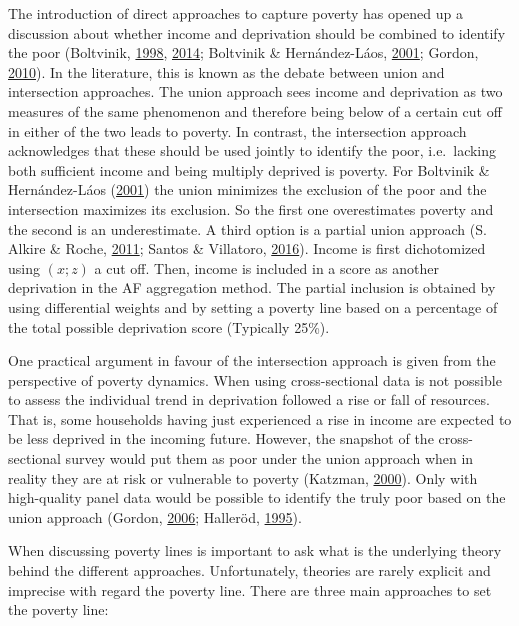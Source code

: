 \documentclass[]{book}
\begin{document}
The introduction of direct approaches to capture poverty has opened up a discussion about whether income and deprivation should be combined to identify the poor (Boltvinik, \protect\hyperlink{ref-Boltvinik1998}{1998}, \protect\hyperlink{ref-Boltvinik2014}{2014}; Boltvinik \& Hernández-Láos, \protect\hyperlink{ref-Boltvinik2001}{2001}; Gordon, \protect\hyperlink{ref-Gordon2010}{2010}). In the literature, this is known as the debate between union and intersection approaches. The union approach sees income and deprivation as two measures of the same phenomenon and therefore being below of a certain cut off in either of the two leads to poverty. In contrast, the intersection approach acknowledges that these should be used jointly to identify the poor, i.e.~lacking both sufficient income and being multiply deprived is poverty. For Boltvinik \& Hernández-Láos (\protect\hyperlink{ref-Boltvinik2001}{2001}) the union minimizes the exclusion of the poor and the intersection maximizes its exclusion. So the first one overestimates poverty and the second is an underestimate. A third option is a partial union approach (S. Alkire \& Roche, \protect\hyperlink{ref-Alkire2011}{2011}; Santos \& Villatoro, \protect\hyperlink{ref-Santos2016}{2016}). Income is first dichotomized using \((x;z)\) a cut off. Then, income is included in a score as another deprivation in the AF aggregation method. The partial inclusion is obtained by using differential weights and by setting a poverty line based on a percentage of the total possible deprivation score (Typically 25\%).

One practical argument in favour of the intersection approach is given from the perspective of poverty dynamics. When using cross-sectional data is not possible to assess the individual trend in deprivation followed a rise or fall of resources. That is, some households having just experienced a rise in income are expected to be less deprived in the incoming future. However, the snapshot of the cross-sectional survey would put them as poor under the union approach when in reality they are at risk or vulnerable to poverty (Katzman, \protect\hyperlink{ref-Katzman2000}{2000}). Only with high-quality panel data would be possible to identify the truly poor based on the union approach (Gordon, \protect\hyperlink{ref-Gordon2006}{2006}; Halleröd, \protect\hyperlink{ref-Hallerod1995}{1995}).

When discussing poverty lines is important to ask what is the underlying theory behind the different approaches. Unfortunately, theories are rarely explicit and imprecise with regard the poverty line. There are three main approaches to set the poverty line:
\end{document}

